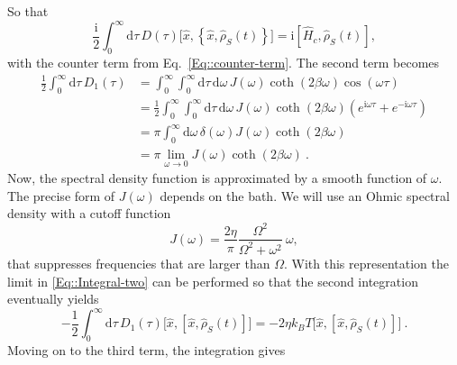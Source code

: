 	So that
	\begin{equation}
		\frac{\mathrm{i}}{2} \int_0^\infty \text{d}\tau\, D(\tau) \Big[\hat{x}, \left\{\hat{x}, \hat{\rho}_S(t)\right\} \Big] =	\mathrm{i} \left[\hat{H}_c, \hat{\rho}_S(t)\right],
	\end{equation}
	with the counter term from Eq.~\eqref{Eq::counter-term}. The second term becomes
	\begin{equation} \label{Eq::Integral-two}
		\begin{split}
			\frac{1}{2} \int_{0}^{\infty} \text{d}\tau\, D_1(\tau) &=	\int_{0}^{\infty} \int_0^\infty \text{d}\tau\,  \text{d} \omega\, J(\omega) \coth \left(2\beta \omega\right) \cos \left(\omega \tau \right) \\
			&= \frac{1}{2}	\int_{0}^{\infty} \int_0^\infty \text{d}\tau\,  \text{d} \omega\, J(\omega) \coth \left(2\beta \omega\right) \left( e^{\mathrm{i} \omega \tau} + e^{-\mathrm{i} \omega \tau} \right) \\
			&= \pi \int_0^\infty \text{d} \omega\, \delta(\omega) J(\omega) \coth \left(2\beta \omega\right) \\
			&=	\pi \lim_{\omega \rightarrow 0} J(\omega) \coth \left(2\beta \omega\right)~.
		\end{split}
	\end{equation}
	Now, the spectral density function is approximated by a smooth function of $\omega$. The precise form of $J(\omega)$ depends on the bath. We will use an Ohmic spectral density with a cutoff function
	\begin{equation} \label{Eq::smooth-J}
		J(\omega) = \frac{2 \eta}{\pi}	\frac{ \Omega^2}{\Omega^2 + \omega^2} ~\omega,
	\end{equation}
	that suppresses frequencies that are larger than $\Omega$. With this representation the limit in \eqref{Eq::Integral-two} can be performed so that the second integration eventually yields
	\begin{equation} \label{Eq::fluctuation-term}
		-\frac{1}{2} \int_{0}^{\infty} \text{d}\tau\, D_1(\tau) \Big[\hat{x}, \left[{\hat{x}} , \hat{\rho}_S(t)\right]\Big] =	-2 \eta k_B T \Big[\hat{x}, \left[{\hat{x}} , \hat{\rho}_S(t)\right]\Big]~.
	\end{equation}
 	Moving on to the third term, the integration gives
